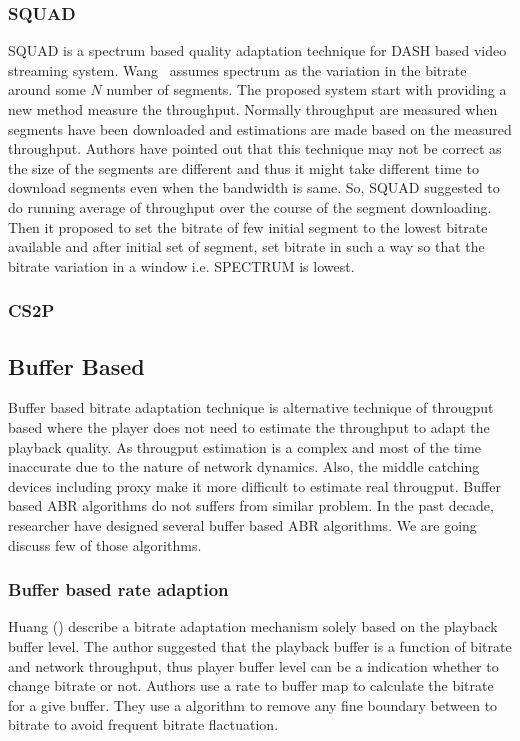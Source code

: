 \subsubsection{SQUAD\cite{10.1145/2910017.2910593}}
SQUAD\cite{10.1145/2910017.2910593} is a spectrum\cite{1386243} based quality adaptation technique for DASH based video streaming system. Wang \etal\ assumes spectrum as the variation in the bitrate around some $N$ number of segments. The proposed system start with providing a new method measure the throughput. Normally throughput are measured when segments have been downloaded and estimations are made based on the measured throughput. Authors have pointed out that this technique may not be correct as the size of the segments are different and thus it might take different time to download segments even when the bandwidth is same. So, SQUAD suggested to do running average of throughput over the course of the segment downloading. Then it proposed to set the bitrate of few initial segment to the lowest bitrate available and after initial set of segment, set bitrate in such a way so that the bitrate variation in a window i.e. SPECTRUM is lowest.

\subsubsection{CS2P\cite{10.1145/2934872.2934898}}



\subsection{Buffer Based}
Buffer based bitrate adaptation technique is alternative technique of througput based where the player does not need to estimate the throughput to adapt the playback quality. As througput estimation is a complex and most of the time inaccurate due to the nature of network dynamics. Also, the middle catching devices including proxy make it more difficult to estimate real througput. Buffer based ABR algorithms do not suffers from similar problem. In the past decade, researcher have designed several buffer based ABR algorithms. We are going discuss few of those algorithms.

\subsubsection{Buffer based rate adaption\cite{10.1145/2619239.2626296,10.1145/2398776.2398800,10.1145/2491172.2491179}}
Huang \etal(\cite{10.1145/2619239.2626296,10.1145/2398776.2398800,10.1145/2491172.2491179}) describe a bitrate adaptation mechanism solely based on the playback buffer level. The author suggested that the playback buffer is a function of bitrate and network throughput, thus player buffer level can be a indication whether to change bitrate or not. Authors use a rate to buffer map to calculate the bitrate for a give buffer. They use a algorithm to remove any fine boundary between to bitrate to avoid frequent bitrate flactuation.

